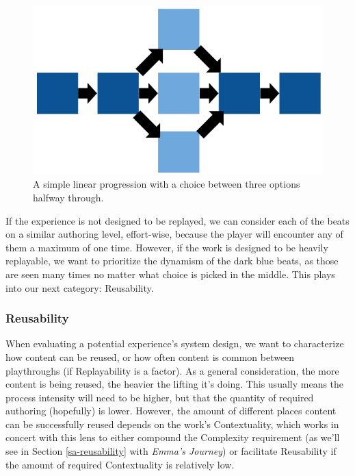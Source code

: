 \begin{figure}
    \centering
    \includegraphics[width=\textwidth]{figures/3.png}
    \caption{A simple linear progression with a choice between three options halfway through.}
    \label{fig:simplegraph}
\end{figure}

If the experience is not designed to be replayed, we can consider each of the beats on a similar authoring level, effort-wise, because the player will encounter any of them a maximum of one time. However, if the work is designed to be heavily replayable, we want to prioritize the dynamism of the dark blue beats, as those are seen many times no matter what choice is picked in the middle. This plays into our next category: Reusability.

\subsubsection{Reusability}

When evaluating a potential experience's system design, we want to characterize how content can be reused, or how often content is common between playthroughs (if Replayability is a factor). As a general consideration, the more content is being reused, the heavier the lifting it's doing. This usually means the process intensity \cite{crawford1987process} will need to be higher, but that the quantity of required authoring (hopefully) is lower. However, the amount of different places content can be successfully reused depends on the work's Contextuality, which works in concert with this lens to either compound the Complexity requirement (as we'll see in Section \ref{sa-reusability} with \textit{Emma's Journey}) or facilitate Reusability if the amount of required Contextuality is relatively low.

